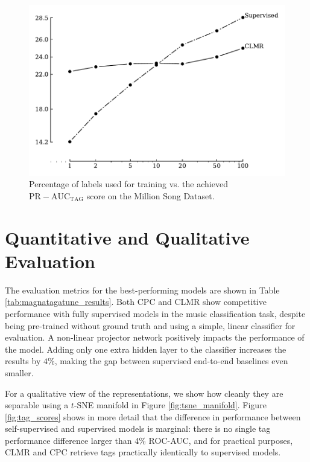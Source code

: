 \begin{figure}[t]
    \centering
    \includegraphics[width=\columnwidth]{figs/perc_train_data_msd.pdf}
    \caption{Percentage of labels used for training vs. the achieved $\mathrm{PR-AUC}_{\mathrm{TAG}}$ score on the Million Song Dataset.}
    \label{fig:perc_train_data_msd}
\end{figure}



\section{Quantitative and Qualitative Evaluation}
The evaluation metrics for the best-performing models are shown in Table \ref{tab:magnatagatune_results}.
Both CPC and CLMR show competitive performance with fully supervised models in the music classification task, despite being pre-trained without ground truth and using a simple, linear classifier for evaluation.
A non-linear projector network positively impacts the performance of the model.
Adding only one extra hidden layer to the classifier increases the results by $4\%$, making the gap between supervised end-to-end baselines even smaller.


For a qualitative view of the representations, we show how cleanly they are  separable using a $t$-SNE manifold in Figure \ref{fig:tsne_manifold}.
Figure \ref{fig:tag_scores} shows in more detail that the difference in performance between self-supervised and supervised models is marginal: there is no single tag performance difference larger than 4\% ROC-AUC, and for practical purposes, CLMR and CPC retrieve tags practically identically to supervised models.

